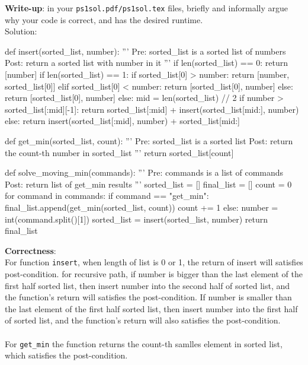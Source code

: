 \documentclass{assignment-263}
\begin{document}
\begin{enumerate}
\textbf{Write-up}: in your \verb|ps1sol.pdf/ps1sol.tex| files, briefly and informally argue why your code is correct, and has the desired runtime.\\
Solution:\\
\begin{python}
def insert(sorted_list, number):
  '''
  Pre: sorted_list is a sorted list of numbers
  Post: return a sorted list with number in it
  '''  
  if len(sorted_list) == 0:
    return [number]
  if len(sorted_list) == 1:
    if sorted_list[0] > number:
      return [number, sorted_list[0]]
    elif sorted_list[0] < number:
      return [sorted_list[0], number]
    else:
      return [sorted_list[0], number]
  else:
    mid = len(sorted_list) // 2
    if number > sorted_list[:mid][-1]:
        return sorted_list[:mid] + insert(sorted_list[mid:], number)
    else:
      return insert(sorted_list[:mid], number) + sorted_list[mid:]
\end{python}
\begin{python}
def get_min(sorted_list, count):
  '''
  Pre: sorted_list is a sorted list
  Post: return the count-th number in sorted_list
  '''  
  return sorted_list[count]
\end{python}
\begin{python}
def solve_moving_min(commands):
  '''
  Pre: commands is a list of commands
  Post: return list of get_min results
  '''
  sorted_list = []
  final_list = []
  count = 0
  for command in commands:
    if command == "get_min":
      final_list.append(get_min(sorted_list, count))
      count += 1
    else:
      number = int(command.split()[1])
      sorted_list = insert(sorted_list, number)
  return final_list  
\end{python}
\end{enumerate}
\textbf{Correctness}:\\
For function \verb|insert|, when length of list is 0 or 1, the return of insert will satisfies post-condition. for recursive path, if number is bigger than the last element of the first half sorted list, then insert number into the second half of sorted list, and the function's return will satisfies the post-condition. If number is smaller than the last element of the first half sorted list, then insert number into the first half of sorted list, and the function's return will also satisfies the post-condition.\\
\\
For \verb|get_min| the function returns the count-th samlles element in sorted list, which satisfies the post-condition.\\
\end{document}
